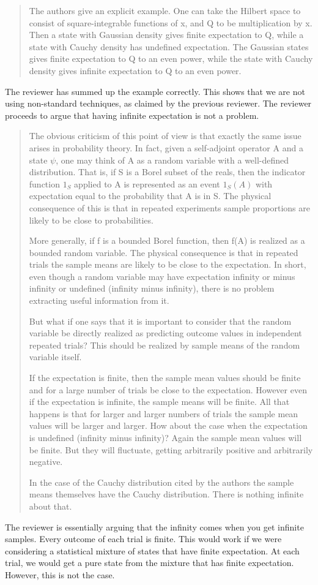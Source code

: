 \documentclass[11pt, executivepaper]{article}
\begin{document}
\begin{quote}
The authors give an explicit example. One can take the Hilbert space to
consist of square-integrable functions of x, and Q to be multiplication by x.
Then a state with Gaussian density gives finite expectation to Q, while a state
with Cauchy density has undefined expectation. The Gaussian states gives finite
expectation to Q to an even power, while the state with Cauchy density gives
infinite expectation to Q to an even power.
\end{quote}
The reviewer has summed up the example correctly. This shows that we are not using non-standard techniques, as claimed by the previous reviewer. The reviewer proceeds to argue that having infinite expectation is not a problem.
\begin{quote}
The obvious criticism of this point of view is that exactly the same issue
arises in probability theory. In fact, given a self-adjoint operator A and a state
$\psi$, one may think of A as a random variable with a well-defined distribution.
That is, if S is a Borel subset of the reals, then the indicator function $1_S$ applied
to A is represented as an event $1_S(A)$ with expectation equal to the probability
that A is in S. The physical consequence of this is that in repeated experiments
sample proportions are likely to be close to probabilities.

More generally, if f is a bounded Borel function, then f(A) is realized as a
bounded random variable. The physical consequence is that in repeated trials
the sample means are likely to be close to the expectation. In short, even though
a random variable may have expectation infinity or minus infinity or undefined
(infinity minus infinity), there is no problem extracting useful information from
it.

But what if one says that it is important to consider that the random variable
be directly realized as predicting outcome values in independent repeated trials?
This should be realized by sample means of the random variable itself.

If the expectation is finite, then the sample mean values should be finite and
for a large number of trials be close to the expectation. However even if the
expectation is infinite, the sample means will be finite. All that happens is that
for larger and larger numbers of trials the sample mean values will be larger and
larger. How about the case when the expectation is undefined (infinity minus
infinity)? Again the sample mean values will be finite. But they will fluctuate,
getting arbitrarily positive and arbitrarily negative.

In the case of the Cauchy distribution cited by the authors the sample means
themselves have the Cauchy distribution. There is nothing infinite about that.
\end{quote}
The reviewer is essentially arguing that the infinity comes when you get infinite samples. Every outcome of each trial is finite. This would work if we were considering a statistical mixture of states that have finite expectation. At each trial, we would get a pure state from the mixture that has finite expectation. However, this is not the case.
\end{document}
